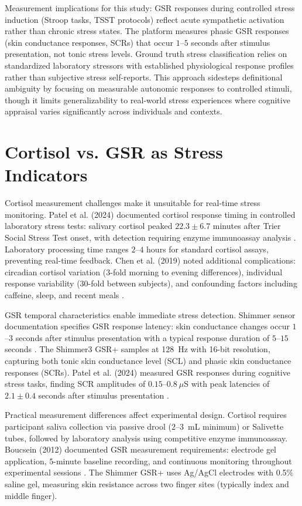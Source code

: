 \documentclass{report}
\begin{document}
    Measurement implications for this study: GSR responses during controlled stress induction (Stroop tasks, TSST protocols) reflect acute sympathetic activation rather than chronic stress states. The platform measures phasic GSR responses (skin conductance responses, SCRs) that occur $1$--$5$ seconds after stimulus presentation, not tonic stress levels. Ground truth stress classification relies on standardized laboratory stressors with established physiological response profiles rather than subjective stress self-reports. This approach sidesteps definitional ambiguity by focusing on measurable autonomic responses to controlled stimuli, though it limits generalizability to real-world stress experiences where cognitive appraisal varies significantly across individuals and contexts.


    \section{Cortisol vs. GSR as Stress Indicators}
    \label{sec:cortisol_vs_gsr}

    Cortisol measurement challenges make it unsuitable for real-time stress monitoring. Patel et al. (2024) documented cortisol response timing in controlled laboratory stress tests: salivary cortisol peaked $22.3 \pm 6.7$ minutes after Trier Social Stress Test onset, with detection requiring enzyme immunoassay analysis \cite{patel2024}. Laboratory processing time ranges $2$--$4$ hours for standard cortisol assays, preventing real-time feedback. Chen et al. (2019) noted additional complications: circadian cortisol variation ($3$-fold morning to evening differences), individual response variability ($30$-fold between subjects), and confounding factors including caffeine, sleep, and recent meals \cite{chen2019}.

    GSR temporal characteristics enable immediate stress detection. Shimmer sensor documentation specifies GSR response latency: skin conductance changes occur $1$--$3$ seconds after stimulus presentation with a typical response duration of $5$--$15$ seconds \cite{shimmerdoc8}. The Shimmer3 GSR+ samples at 128~Hz with 16-bit resolution, capturing both tonic skin conductance level (SCL) and phasic skin conductance responses (SCRs). Patel et al. (2024) measured GSR responses during cognitive stress tasks, finding SCR amplitudes of $0.15$--$0.8~\mu$S with peak latencies of $2.1 \pm 0.4$ seconds after stimulus presentation \cite{patel2024}.

    Practical measurement differences affect experimental design. Cortisol requires participant saliva collection via passive drool ($2$--$3$~mL minimum) or Salivette tubes, followed by laboratory analysis using competitive enzyme immunoassay. Boucsein (2012) documented GSR measurement requirements: electrode gel application, $5$-minute baseline recording, and continuous monitoring throughout experimental sessions \cite{boucsein2012}. The Shimmer GSR+ uses Ag/AgCl electrodes with 0.5\% saline gel, measuring skin resistance across two finger sites (typically index and middle finger).
\end{document}
